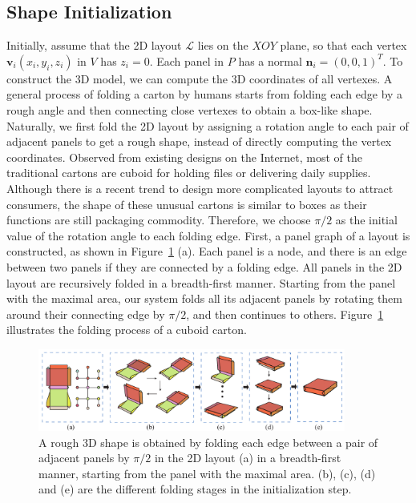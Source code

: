 
\subsection{Shape Initialization}
\label{sec:initialization}
 
Initially, assume that the 2D layout $\mathcal{L}$ lies on the $XOY$ plane, so that each vertex $\mathbf{v}_i(x_i,y_i,z_i)$ in $V$ has $z_i=0$. 
Each panel in $P$ has a normal $\mathbf{n}_i=(0,0,1)^T$. 
To construct the 3D model, we can compute the 3D coordinates of all vertexes. 
%
A general process of folding a carton by humans starts from folding each edge by a rough angle and then connecting close vertexes to obtain a box-like shape. 
Naturally, we first fold the 2D layout by assigning a rotation angle to each pair of adjacent panels to get a rough shape, instead of directly computing the vertex coordinates.
%	
Observed from existing designs on the Internet, most of the traditional cartons are cuboid for holding files or delivering daily supplies. 
Although there is a recent trend to design more complicated layouts to attract consumers, the shape of these unusual cartons is similar to boxes as their functions are still packaging commodity. 
%
Therefore, we choose $\pi/2$ as the initial value of the rotation angle to each folding edge. 
%
First, a panel graph of a layout is constructed, as shown in Figure~\ref{fig:midresult} (a).
Each panel is a node, and there is an edge between two panels if they are connected by a folding edge.
%
All panels in the 2D layout are recursively folded in a breadth-first manner.
Starting from the panel with the maximal area, our system folds all its adjacent panels by rotating them around their connecting edge by $\pi/2$, and then continues to others. 
Figure~\ref{fig:midresult} illustrates the folding process of a cuboid carton. 

\begin{figure}
	\centering
	\includegraphics[width=0.9\textwidth]{images/midresult}
	\caption{A rough 3D shape is obtained by folding each edge between a pair of adjacent panels by $\pi/2$ in the 2D layout (a) in a breadth-first manner, starting from the panel with the maximal area. (b), (c), (d) and (e) are the different folding stages in the initialization step.}
	\label{fig:midresult}
\end{figure}



